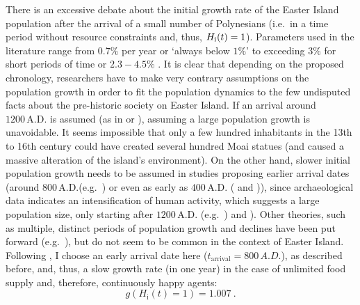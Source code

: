 There is an excessive debate about the initial growth rate of the Easter Island population after the arrival of a small number of Polynesians (i.e.\ in a time period without resource constraints and, thus, $H_{\rm i}(t)=1$).
Parameters used in the literature range from $0.7\%$ per year \citep{Bahn2017} or `always below $1\%$' \citep{Brander1998} to exceeding $3\%$ \citep{Hunt2007} for short periods of time or $2.3-4.5\%$ \citep{Brandt2015}.
It is clear that depending on the proposed chronology, researchers have to make very contrary assumptions on the population growth in order to fit the population dynamics to the few undisputed facts about the pre-historic society on Easter Island. 
If an arrival around $1200\, \text{A.D.}$ is assumed (as in \citet{Hunt2007} or \citet{Brandt2015}), assuming a large population growth is unavoidable. 
It seems impossible that only a few hundred inhabitants in the 13th to 16th century could have created several hundred Moai statues (and caused a massive alteration of the island's environment).
On the other hand, slower initial population growth needs to be assumed in studies proposing earlier arrival dates (around $800\, \text{A.D.}$(e.g.\ \citet{Bahn2017}) or even as early as $400\, \text{A.D.}$ (\citet{Good2006} and \citet{Brander1998})), since archaeological data indicates an intensification of human activity, which suggests a large population size, only starting after $1200\, \text{A.D.}$ (e.g.\ \citet{Bahn2017}) and \citet{Hunt2007}).
Other theories, such as multiple, distinct periods of population growth and declines have been put forward (e.g.\ \citet{Cole2008}), but do not seem to be common in the context of Easter Island.
Following \citet{Bahn2017}, I choose an early arrival date here ($t_\text{arrival}=800\, A.D.$), as described before, and, thus, a slow growth rate (in one year) in the case of unlimited food supply and, therefore, continuously happy agents: 
\begin{equation}
	g(H_\text{i}(t)=1) = 1.007 \ .
\end{equation}

